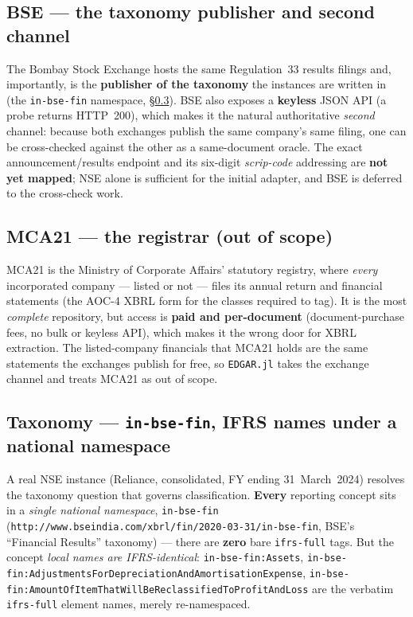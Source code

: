 \documentclass[11pt,a4paper]{report}
\begin{document}
\subsection{BSE --- the taxonomy publisher and second channel}
The Bombay Stock Exchange hosts the same Regulation~33 results filings and, importantly, is the
\textbf{publisher of the taxonomy} the instances are written in (the \texttt{in-bse-fin} namespace,
\S\ref{sec:india-taxonomy}). BSE also exposes a \textbf{keyless} JSON API (a probe returns HTTP~200), which
makes it the natural authoritative \emph{second} channel: because both exchanges publish the same company's
same filing, one can be cross-checked against the other as a same-document oracle. The exact
announcement/results endpoint and its six-digit \emph{scrip-code} addressing are \textbf{not yet mapped};
NSE alone is sufficient for the initial adapter, and BSE is deferred to the cross-check work.

\subsection{MCA21 --- the registrar (out of scope)}
MCA21 is the Ministry of Corporate Affairs' statutory registry, where \emph{every} incorporated company ---
listed or not --- files its annual return and financial statements (the AOC-4 XBRL form for the classes
required to tag). It is the most \emph{complete} repository, but access is \textbf{paid and per-document}
(document-purchase fees, no bulk or keyless API), which makes it the wrong door for XBRL extraction. The
listed-company financials that MCA21 holds are the same statements the exchanges publish for free, so
\texttt{EDGAR.jl} takes the exchange channel and treats MCA21 as out of scope.

\subsection{Taxonomy --- \texttt{in-bse-fin}, IFRS names under a national namespace}\label{sec:india-taxonomy}
A real NSE instance (Reliance, consolidated, FY ending 31~March~2024) resolves the taxonomy question that
governs classification. \textbf{Every} reporting concept sits in a \emph{single national namespace},
\texttt{in-bse-fin} (\texttt{http://www.bseindia.com/xbrl/fin/2020-03-31/in-bse-fin}, BSE's ``Financial
Results'' taxonomy) --- there are \textbf{zero} bare \texttt{ifrs-full} tags. But the concept
\emph{local names are IFRS-identical}: \texttt{in-bse-fin:Assets},
\texttt{in-bse-fin:AdjustmentsForDepreciationAndAmortisationExpense},
\texttt{in-bse-fin:AmountOfItemThatWillBeReclassifiedToProfitAndLoss} are the verbatim \texttt{ifrs-full}
element names, merely re-namespaced.
\end{document}
